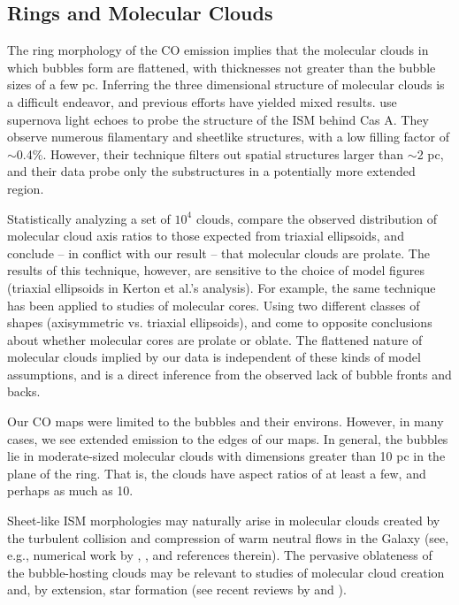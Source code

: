 \subsection{Rings and Molecular Clouds}

The ring morphology of the CO emission implies that the molecular clouds in which bubbles
form are flattened, with thicknesses not greater than the bubble sizes of a few pc. Inferring
the three dimensional structure of molecular clouds is a difficult endeavor, and previous
efforts have yielded mixed results.  use supernova light echoes to probe the
structure of the ISM behind Cas A. They observe numerous filamentary and sheetlike structures,
with a low filling factor of $\sim$0.4\%. However, their technique filters out spatial structures
larger than $\sim$2 pc, and their data probe only the substructures in a potentially
more extended region.

Statistically analyzing a set of $10^4$ clouds, 
compare the observed distribution of molecular cloud axis ratios to those
expected from triaxial ellipsoids, and conclude -- in conflict with our result -- that molecular clouds
are prolate. The results of this technique, however, are sensitive to the choice of model
figures (triaxial ellipsoids in Kerton et al.'s analysis). For example, the same technique has been applied to
studies of molecular cores. Using two different classes of shapes (axisymmetric vs. triaxial ellipsoids),
 and  come to opposite conclusions about whether molecular cores
are prolate or oblate. The flattened nature of molecular clouds implied by our data is independent of
these kinds of model assumptions, and is a direct inference from the observed lack of bubble fronts and backs.

Our CO maps were limited to the bubbles and their environs. However, in many cases, we see extended emission
to the edges of our maps. In general, the bubbles lie in moderate-sized molecular clouds with dimensions
greater than 10 pc in the plane of the ring. That is, the clouds have aspect ratios of at least a few, and
perhaps as much as 10.

Sheet-like ISM morphologies may naturally arise in molecular clouds created
by the turbulent collision and compression of warm neutral flows in
the Galaxy (see, e.g., numerical work by \citealt{Heitsch05},
\citealt{Vazquez06}, and references therein). The pervasive
oblateness of the bubble-hosting clouds may be relevant to studies of
molecular cloud creation and, by extension, star formation
(see recent reviews by \citealt{McKee07} and \citealt{Zinnecker07}).

